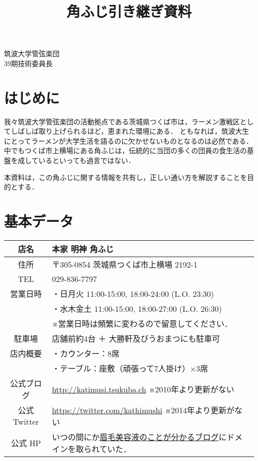 \documentclass[uplatex]{jsarticle}
\title{角ふじ引き継ぎ資料}
\date{}
\begin{document}
 \maketitle

 \begin{flushright}
  筑波大学管弦楽団\\
  39期技術委員長
 \end{flushright}

 \section*{はじめに}

 我々筑波大学管弦楽団の活動拠点である茨城県つくば市は，ラーメン激戦区としてしばしば取り上げられるほど，恵まれた環境にある．
 ともなれば，筑波大生にとってラーメンが大学生活を語るのに欠かせないものとなるのは必然である．
 中でもつくば市上横場にある角ふじは，伝統的に当団の多くの団員の食生活の基盤を成しているといっても過言ではない．

 本資料は，この角ふじに関する情報を共有し，正しい通い方を解説することを目的とする．

 \section{基本データ}

 \begin{tabular}{|c|l|}
  \hline
  店名         & 本家 明神 角ふじ \\
  \hline
  住所         & 〒305-0854 茨城県つくば市上横場 2192-1 \\
  \hline
  TEL          & 029-836-7797 \\
  \hline
  営業日時     & ・日月火 11:00-15:00, 18:00-24:00 (L.O. 23:30)\\
               & ・水木金土 11:00-15:00, 18:00-27:00 (L.O. 26:30)\\
               & ※営業日時は頻繁に変わるので留意してください．\\
  \hline
  駐車場       & 店舗前約4台 ＋ 大勝軒及びうおまつにも駐車可 \\
  \hline
  店内概要     & ・カウンター：8席 \\
               & ・テーブル：座敷（頑張って7人掛け）×3席 \\
  \hline
  公式ブログ   & \url{http://katimusi.tsukuba.ch} ※2010年より更新がない \\
  \hline
  公式 Twitter & \url{https://twitter.com/kathimushi} ※2014年より更新がない \\
  \hline
  公式 HP      & いつの間にか\href{http://www.katimusi.com/}{眉毛美容液のことが分かるブログ}にドメインを取られていた．\\
  \hline
 \end{tabular}
\end{document}
